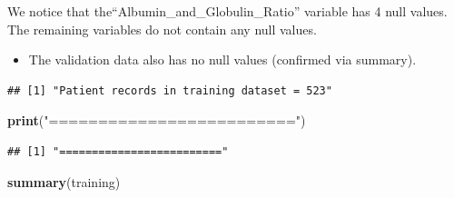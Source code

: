 \documentclass[]{article}
\newenvironment{Shaded}{\begin{snugshade}}{\end{snugshade}}
\newcommand{\KeywordTok}[1]{\textcolor[rgb]{0.13,0.29,0.53}{\textbf{#1}}}
\newcommand{\NormalTok}[1]{#1}
\newcommand{\StringTok}[1]{\textcolor[rgb]{0.31,0.60,0.02}{#1}}
\begin{document}
We notice that the``Albumin\_and\_Globulin\_Ratio'' variable has 4 null values. The
remaining variables do not contain any null values.

\begin{itemize}
\item The validation data also has no null values (confirmed via summary).
\end{itemize}

\begin{Shaded}
\end{Shaded}

\begin{verbatim}
## [1] "Patient records in training dataset = 523"
\end{verbatim}

\begin{Shaded}
\begin{Highlighting}[]
\KeywordTok{print}\NormalTok{(}\StringTok{"========================="}\NormalTok{)}
\end{Highlighting}
\end{Shaded}

\begin{verbatim}
## [1] "========================="
\end{verbatim}

\begin{Shaded}
\begin{Highlighting}[]
\KeywordTok{summary}\NormalTok{(training)}
\end{Highlighting}
\end{Shaded}
\end{document}
